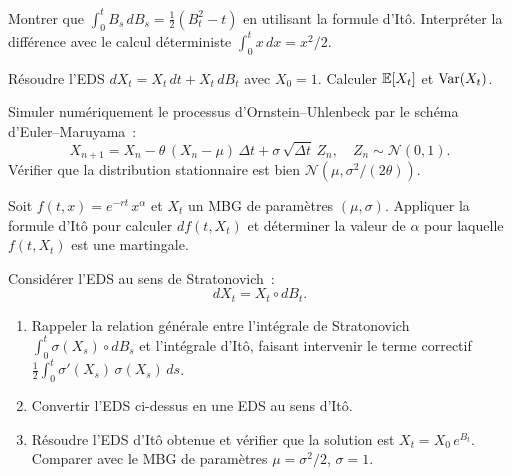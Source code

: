 \begin{exercice}
Montrer que $\int_0^t B_s\,dB_s = \frac{1}{2}(B_t^2 - t)$ en utilisant
la formule d'It\^o. Interpr\'eter la diff\'erence avec le calcul
d\'eterministe $\int_0^t x\,dx = x^2/2$.
\end{exercice}

\begin{exercice}
R\'esoudre l'EDS $dX_t = X_t\,dt + X_t\,dB_t$ avec $X_0 = 1$.
Calculer $\mathbb{E}[X_t]$ et $\mathrm{Var}(X_t)$.
\end{exercice}

\begin{exercice}
Simuler num\'eriquement le processus d'Ornstein--Uhlenbeck par le sch\'ema
d'Euler--Maruyama~:
\[
  X_{n+1} = X_n - \theta\,(X_n - \mu)\,\Delta t + \sigma\,\sqrt{\Delta t}\,Z_n,
  \quad Z_n \sim \mathcal{N}(0,1).
\]
V\'erifier que la distribution stationnaire est bien
$\mathcal{N}(\mu, \sigma^2/(2\theta))$.
\end{exercice}

\begin{exercice}
Soit $f(t,x) = e^{-rt}\,x^\alpha$ et $X_t$ un MBG de param\`etres
$(\mu, \sigma)$. Appliquer la formule d'It\^o pour calculer $df(t, X_t)$
et d\'eterminer la valeur de $\alpha$ pour laquelle $f(t, X_t)$ est
une martingale.
\end{exercice}

\begin{exercice}
Consid\'erer l'EDS au sens de Stratonovich~:
\[
  dX_t = X_t \circ dB_t.
\]
\begin{enumerate}
  \item Rappeler la relation g\'en\'erale entre l'int\'egrale de Stratonovich
        $\int_0^t \sigma(X_s) \circ dB_s$ et l'int\'egrale d'It\^o, faisant
        intervenir le terme correctif $\frac{1}{2}\int_0^t \sigma'(X_s)\,\sigma(X_s)\,ds$.
  \item Convertir l'EDS ci-dessus en une EDS au sens d'It\^o.
  \item R\'esoudre l'EDS d'It\^o obtenue et v\'erifier que la solution
        est $X_t = X_0\,e^{B_t}$. Comparer avec le MBG de param\`etres
        $\mu = \sigma^2/2$, $\sigma = 1$.
\end{enumerate}
\end{exercice}

